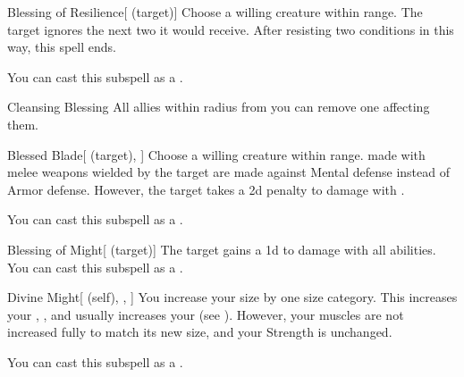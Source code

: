\begin{ability}[\nth{1}]{Blessing of Resilience}[ (target)]
Choose a willing creature within \rngclose range.
The target ignores the next two  it would receive.
After resisting two conditions in this way, this spell ends.

You can cast this subspell as a .
\end{ability}
\vspace{0.25em}



\begin{ability}[\nth{1}]{Cleansing Blessing}
All allies within \arealarge radius from you can remove one  affecting them.
\end{ability}
\vspace{0.25em}



\begin{ability}[\nth{2}]{Blessed Blade}[ (target), ]
Choose a willing creature within \rngclose range.
 made with melee weapons wielded by the target are made against Mental defense instead of Armor defense.
However, the target takes a \minus2d penalty to damage with .

You can cast this subspell as a .
\end{ability}
\vspace{0.25em}



\begin{ability}[\nth{2}]{Blessing of Might}[ (target)]
The target gains a \plus1d  to damage with all abilities.
You can cast this subspell as a .
\end{ability}
\vspace{0.25em}



\begin{ability}[\nth{3}]{Divine Might}[ (self), , ]
You increase your size by one size category.
This increases your , , and usually increases your  (see ).
However, your muscles are not increased fully to match its new size, and your Strength is unchanged.

You can cast this subspell as a .
\end{ability}
\vspace{0.25em}



